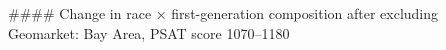 #### Change in race × first-generation composition after excluding Geomarket: Bay Area, PSAT score 1070–1180
